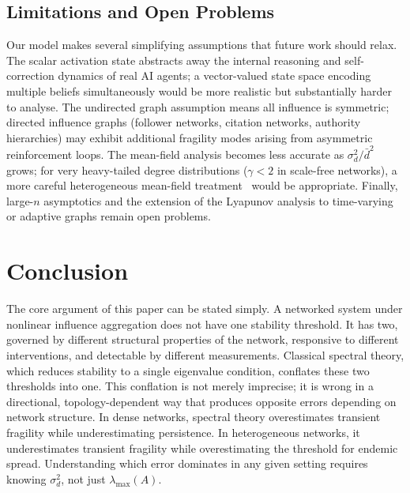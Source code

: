 \documentclass[10pt,twocolumn]{article}
\theoremstyle{myproof}
\newcommand{\lmax}{\lambda_{\max}}
\begin{document}
\vspace{-2pt}\subsection{Limitations and Open Problems}
Our model makes several simplifying assumptions that future work should relax. The scalar
activation state abstracts away the internal reasoning and self-correction dynamics of real AI
agents; a vector-valued state space encoding multiple beliefs simultaneously would be more
realistic but substantially harder to analyse. The undirected graph assumption means all influence
is symmetric; directed influence graphs (follower networks, citation networks, authority
hierarchies) may exhibit additional fragility modes arising from asymmetric reinforcement loops.
The mean-field analysis becomes less accurate as $\sigma^2_d/\bar{d}^2$ grows; for very heavy-tailed
degree distributions ($\gamma<2$ in scale-free networks), a more careful heterogeneous mean-field
treatment~\cite{pastor2015} would be appropriate. Finally, large-$n$ asymptotics and the extension
of the Lyapunov analysis to time-varying or adaptive graphs remain open problems.

\section{Conclusion}
\label{sec:conclusion}
\vspace{-2pt}

The core argument of this paper can be stated simply. A networked system under nonlinear
influence aggregation does not have one stability threshold. It has two, governed by different
structural properties of the network, responsive to different interventions, and detectable by
different measurements. Classical spectral theory, which reduces stability to a single eigenvalue
condition, conflates these two thresholds into one. This conflation is not merely imprecise; it
is wrong in a directional, topology-dependent way that produces opposite errors depending on
network structure. In dense networks, spectral theory overestimates transient fragility while
underestimating persistence. In heterogeneous networks, it underestimates transient fragility
while overestimating the threshold for endemic spread. Understanding which error dominates in any
given setting requires knowing $\sigma^2_d$, not just $\lmax(A)$.
\end{document}
